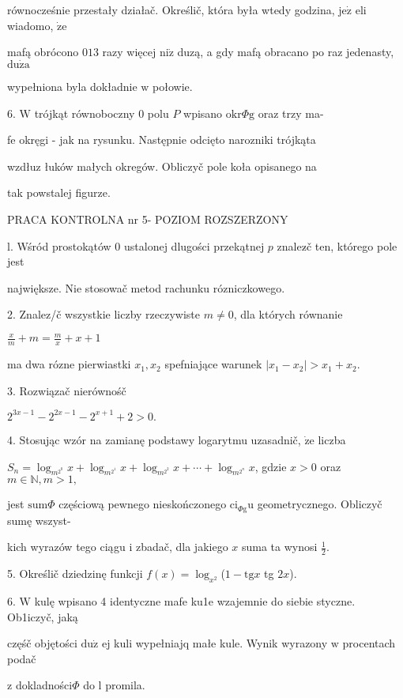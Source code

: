\documentclass[a4paper,12pt]{article}
\begin{document}
równocześnie przestały działač. Określič, która była wtedy godzina, $\mathrm{j}\mathrm{e}\dot{\mathrm{z}}$ eli wiadomo, $\dot{\mathrm{z}}\mathrm{e}$

mafą obrócono $013$ razy więcej $\mathrm{n}\mathrm{i}\dot{\mathrm{z}}$ duzą, a gdy mafą obracano po raz jedenasty, $\mathrm{d}\mathrm{u}\dot{\mathrm{z}}\mathrm{a}$

wypełniona byla dokładnie $\mathrm{w}$ połowie.

6. $\mathrm{W}$ trójkąt równoboczny $0$ polu $P$ wpisano $\mathrm{o}\mathrm{k}\mathrm{r}\Phi \mathrm{g}$ oraz trzy ma-

fe okręgi - jak na rysunku. Następnie odcięto narozniki trójkąta

wzdłuz łuków małych okregów. Obliczyč pole koła opisanego na

tak powstalej figurze.





PRACA KONTROLNA nr 5- POZIOM ROZSZERZONY

l. Wśród prostokątów $0$ ustalonej dlugości przekątnej $p$ znalez$\acute{}$č ten, którego pole jest

największe. Nie stosowač metod rachunku rózniczkowego.

2. Znalez/č wszystkie liczby rzeczywiste $m\neq 0$, dla których równanie

$\displaystyle \frac{x}{m}+m=\frac{m}{x}+x+1$

ma dwa rózne pierwiastki $x_{1}, x_{2}$ spefniające warunek $|x_{1}-x_{2}|>x_{1}+x_{2}.$

3. Rozwiązač nierównośč

$2^{3x-1}-2^{2x-1}-2^{x+1}+2>0.$

4. Stosując wzór na zamianę podstawy logarytmu uzasadnič, $\dot{\mathrm{z}}\mathrm{e}$ liczba

$S_{n}=\log_{m^{2^{0}}}x+\log_{m^{2^{1}}}x+\log_{m^{2^{2}}}x+\cdots+\log_{m^{2^{n}}}x$, gdzie $x>0$ oraz $m\in \mathbb{N}, m>1,$

jest $\mathrm{s}\mathrm{u}\mathrm{m}\Phi$ częściową pewnego nieskończonego $\mathrm{c}\mathrm{i}_{\Phi \mathrm{g}}\mathrm{u}$ geometrycznego. Obliczyč sumę wszyst-

kich wyrazów tego ciągu $\mathrm{i}$ zbadač, dla jakiego $x$ suma ta wynosi $\displaystyle \frac{1}{2}.$

5. Określič dziedzinę funkcji $f(x)=\log_{x^{2}}$($1-\mathrm{t}\mathrm{g}x$ tg $2x$).

6. $\mathrm{W}$ kulę wpisano 4 identyczne mafe ku1e wzajemnie do siebie styczne. Ob1iczyč, jaką

częśč objętości $\mathrm{d}\mathrm{u}\dot{\mathrm{z}}$ ej kuli wypełniajq małe kule. Wynik wyrazony $\mathrm{w}$ procentach podač

$\mathrm{z}$ dokladności$\Phi$ do l promila.
\end{document}
